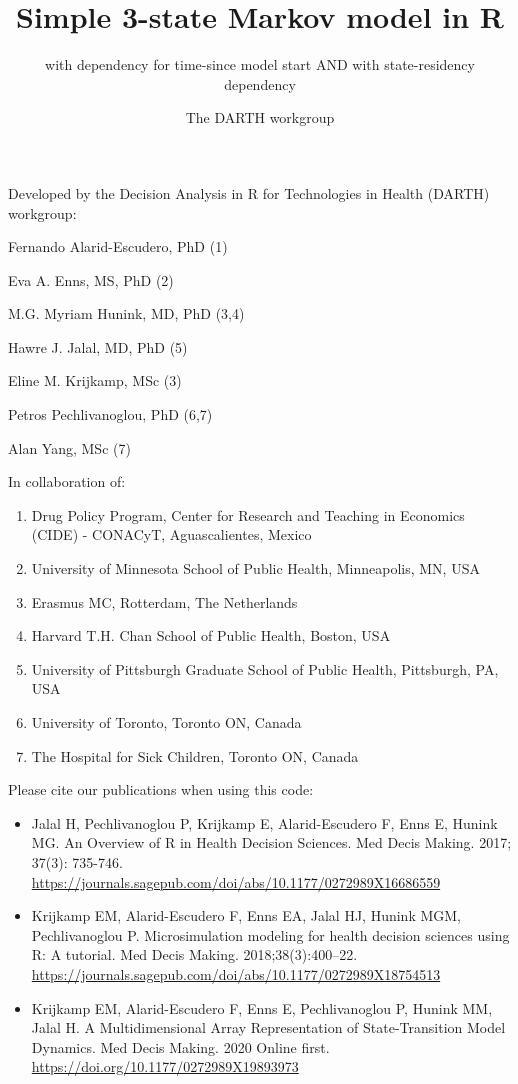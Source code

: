 \documentclass[
]{article}
\title{Simple 3-state Markov model in R}
\subtitle{with dependency for time-since model start AND with state-residency
dependency}
\author{The DARTH workgroup}
\date{}
\providecommand{\tightlist}{%
  \setlength{\itemsep}{0pt}\setlength{\parskip}{0pt}}
\begin{document}
\maketitle

Developed by the Decision Analysis in R for Technologies in Health
(DARTH) workgroup:

Fernando Alarid-Escudero, PhD (1)

Eva A. Enns, MS, PhD (2)

M.G. Myriam Hunink, MD, PhD (3,4)

Hawre J. Jalal, MD, PhD (5)

Eline M. Krijkamp, MSc (3)

Petros Pechlivanoglou, PhD (6,7)

Alan Yang, MSc (7)

In collaboration of:

\begin{enumerate}
\def\labelenumi{\arabic{enumi}.}
\tightlist
\item
  Drug Policy Program, Center for Research and Teaching in Economics
  (CIDE) - CONACyT, Aguascalientes, Mexico
\item
  University of Minnesota School of Public Health, Minneapolis, MN, USA
\item
  Erasmus MC, Rotterdam, The Netherlands
\item
  Harvard T.H. Chan School of Public Health, Boston, USA
\item
  University of Pittsburgh Graduate School of Public Health, Pittsburgh,
  PA, USA
\item
  University of Toronto, Toronto ON, Canada
\item
  The Hospital for Sick Children, Toronto ON, Canada
\end{enumerate}

Please cite our publications when using this code:

\begin{itemize}
\item
  Jalal H, Pechlivanoglou P, Krijkamp E, Alarid-Escudero F, Enns E,
  Hunink MG. An Overview of R in Health Decision Sciences. Med Decis
  Making. 2017; 37(3): 735-746.
  \url{https://journals.sagepub.com/doi/abs/10.1177/0272989X16686559}
\item
  Krijkamp EM, Alarid-Escudero F, Enns EA, Jalal HJ, Hunink MGM,
  Pechlivanoglou P. Microsimulation modeling for health decision
  sciences using R: A tutorial. Med Decis Making. 2018;38(3):400--22.
  \url{https://journals.sagepub.com/doi/abs/10.1177/0272989X18754513}
\item
  Krijkamp EM, Alarid-Escudero F, Enns E, Pechlivanoglou P, Hunink MM,
  Jalal H. A Multidimensional Array Representation of State-Transition
  Model Dynamics. Med Decis Making. 2020 Online first.
  \url{https://doi.org/10.1177/0272989X19893973}
\end{itemize}
\end{document}
